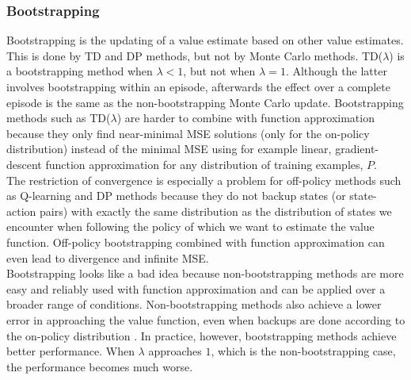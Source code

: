 \documentclass[a4paper, 11pt]{article}
\begin{document}
\subsubsection{Bootstrapping}
\label{subs:rl_bootstrapping}
Bootstrapping is the updating of a value estimate based on other value estimates. This is done by TD and DP methods, but not by Monte Carlo methods. TD($\lambda$) is a bootstrapping method when $\lambda <1$, but not when $\lambda = 1$. Although the latter involves bootstrapping within an episode, afterwards the effect over a complete episode is the same as the non-bootstrapping Monte Carlo update. Bootstrapping methods such as TD($\lambda$) are harder to combine with function approximation because they only find near-minimal MSE solutions (only for the on-policy distribution) instead of the minimal MSE using for example linear, gradient-descent function approximation for any distribution of training examples, $P$.\\
The restriction of convergence is especially a problem for off-policy methods such as Q-learning and DP methods because they do not backup states (or state-action pairs) with exactly the same distribution as the distribution of states we encounter when following the policy of which we want to estimate the value function. Off-policy bootstrapping combined with function approximation can even lead to divergence and infinite MSE.\\

Bootstrapping looks like a bad idea because non-bootstrapping methods are more easy and reliably used with function approximation and can be applied over a broader range of conditions. Non-bootstrapping methods also achieve a lower error in approaching the value function, even when backups are done according to the on-policy distribution \citep{ML}. In practice, however, bootstrapping methods achieve better performance. When $\lambda$ approaches $1$, which is the non-bootstrapping case, the performance becomes much worse.
\end{document}
